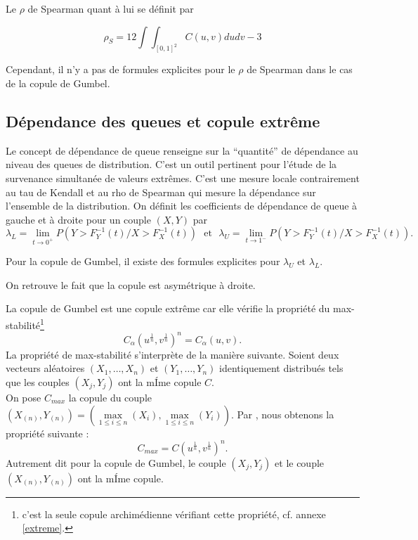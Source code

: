 \documentclass[11pt]{article}
\newcommand{\txtm}[1]{\textrm{~~#1~~}}
\begin{document}
Le $\rho$ de Spearman quant \`a lui se d\'efinit par

$$\rho_S = 12\int\!\!\!\!\int_{[0,1]^2}C(u,v)dudv-3$$

Cependant, il n'y a pas de formules explicites pour le $\rho$ de Spearman dans le cas de la copule de Gumbel.

\subsection{D\'ependance des queues et copule extr\^eme}
\label{dependance}
Le concept de d\'ependance de queue renseigne sur la ``quantit\'e'' de d\'e\-pen\-dance 
au niveau des queues de distribution. C'est un outil pertinent pour l'\'etude de la survenance simultan\'ee de valeurs extr\^emes.
C'est une mesure locale contrairement au tau de Kendall et au rho de Spearman qui mesure la d\'ependance sur l'ensemble de la distribution.
On d\'efinit les coefficients de d\'ependance de queue \`a gauche et \`a droite pour un couple $(X,Y)$ par
$$
\lambda_L = \underset{t\rightarrow0^+}{\lim} P(Y > F_Y^{-1}(t) / X > F_X^{-1}(t)) \txtm{et} \lambda_U = \underset{t\rightarrow1^-}{\lim} P(Y > F_Y^{-1}(t) / X > F_X^{-1}(t)).
$$

\medskip
Pour la copule de Gumbel, il existe des formules explicites pour $\lambda_U$ et $\lambda_L$.
\begin{center}
\fbox{$ \lambda_L = 0 \txtm{et} \lambda_U = 2-2^{\frac{1}{\alpha}}. $}
\end{center}
On retrouve le fait que la copule est asym\'etrique \`a droite.

\medskip


La copule de Gumbel est une copule extr\^eme car elle v\'erifie la propri\'et\'e du 
max-stabilit\'e\footnote{c'est la seule copule archim\'edienne v\'erifiant cette propri\'et\'e, cf. annexe \ref{extreme}.} 
$$
C_\alpha\left(u^{\frac{1}{n}},v^{\frac{1}{n}}\right)^n = C_\alpha(u,v).
$$
La propri\'et\'e de max-stabilit\'e s'interpr\`ete de la mani\`ere suivante. Soient deux vecteurs
al\'eatoires $(X_1,\dots,X_n)$ et $(Y_1,\dots,Y_n)$ identiquement distribu\'es tels que 
les couples $(X_j, Y_j)$ ont la mÍme copule $C$. \\
On pose $C_{max}$ la copule du couple 
$(X_{(n)},Y_{(n)}) = (\underset{1\leq i\leq n}{\max}(X_i), \underset{1\leq i\leq n}{\max}(Y_i))$.
Par \cite{nelsen2}, nous obtenons la propri\'et\'e suivante :
$$
C_{max} = C\left(u^{\frac{1}{n}},v^{\frac{1}{n}}\right)^n.
$$
Autrement dit pour la copule de Gumbel, le couple $(X_j, Y_j)$ et le couple 
$(X_{(n)},Y_{(n)})$ ont la mÍme copule.
\end{document}
